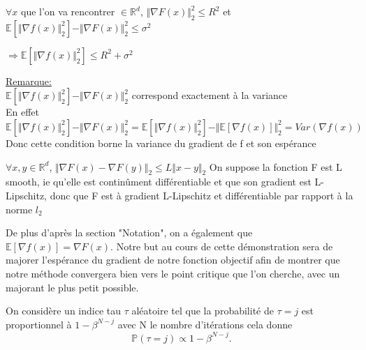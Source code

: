 \documentclass{article}
\begin{document}
\bigskip

\begin{assumption}

 $\forall x$ que l'on va rencontrer $\in \mathbb{R}^d$, $ \Vert \nabla F(x)  \Vert ^2_2 \leq R^2$ et $\mathbb{E}[ \Vert \nabla f(x) \Vert ^2_2]-  \Vert \nabla F(x)  \Vert ^2_2 \leq \sigma ^2$
 
$\Rightarrow \mathbb{E}[ \Vert \nabla f(x) \Vert ^2_2] \leq R^2+ \sigma^2 $
 \begin{equation}
    \label{eq:C2}
\end{equation}
\end{assumption}

\noindent \underline{Remarque:}\\
$\mathbb{E}[ \Vert \nabla f(x) \Vert ^2_2]-  \Vert \nabla F(x)  \Vert ^2_2 $ correspond exactement à la variance \\
En effet
 $\mathbb{E}[ \Vert \nabla f(x) \Vert ^2_2]-  \Vert \nabla F(x)  \Vert ^2_2 = \mathbb{E}[ \Vert \nabla f(x) \Vert ^2_2]-  \Vert \mathbb{E}[\nabla f(x)]  \Vert ^2_2= Var(\nabla f(x))$ \\
 Donc cette condition borne la variance du gradient de f et son espérance

\begin{assumption}

 $\forall x,y \in \mathbb{R}^d$, $  \Vert  \nabla F(x) - \nabla F(y) \Vert _2 \leq L  \Vert x-y \Vert _2$ 
\newline
On suppose la fonction F est L smooth, ie qu'elle est continûment différentiable et que son gradient est L-Lipschitz, donc que F est à gradient L-Lipschitz et différentiable par rapport à la norme $l_2$
 \begin{equation}
    \label{eq:C3}
\end{equation}
\end{assumption}
De plus d'après la section "Notation", on a également que $\mathbb{E}[\nabla f(x)]= \nabla F(x)$.
Notre but au cours de cette démonstration sera de majorer l'espérance du gradient de notre fonction objectif afin de montrer que notre méthode convergera bien vers le point critique que l'on cherche, avec un majorant le plus petit possible.

\bigskip

On considère un indice tau $\tau$ aléatoire tel que la probabilité de $\tau= j$ est proportionnel à $1-\beta^{N-j}$ avec N le nombre d'itérations cela donne \begin{equation}
\label{eq:loi_de_tau}
\mathbb{P}(\tau = j) \propto 1- \beta^{N-j}.
\end{equation}
\end{document}
